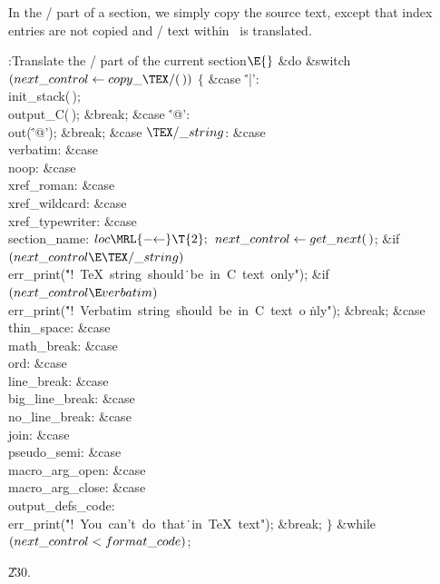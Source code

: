 In the \TEX/ part of a section, we simply copy the source text, except
that
index entries are not copied and \CEE/ text within \pb\ is translated.

\Y\B\4:Translate the \TEX/ part of the current section\X${}\E{}$\6
\&{do}\5
\&{switch} ${}(\\{next\_control}\K\copyxTeX(\,)){}$\5
${}\{{}$\1\6
\4\&{case} \.{'|'}:\5
\\{init\_stack}(\,);\6
\\{output\_C}(\,);\6
\&{break};\6
\4\&{case} \.{'@'}:\5
\\{out}(\.{'@'});\6
\&{break};\6
\4\&{case} ${}\TeXxstring{}$:\5
\&{case} \\{verbatim}:\5
\&{case} \\{noop}:\5
\&{case} \\{xref\_roman}:\5
\&{case} \\{xref\_wildcard}:\5
\&{case} \\{xref\_typewriter}:\5
\&{case} \\{section\_name}:\5
${}\\{loc}\MRL{-{\K}}\T{2};{}$\6
${}\\{next\_control}\leftarrow\\{get\_next}(\,){}$;\6
\&{if} ${}(\\{next\_control}\E\TeXxstring){}$\1\5
\\{err\_print}(\.{"!\ TeX\ string\ should}\)\.{\ be\ in\ C\ text\ only"});\2\6
\&{if} ${}(\\{next\_control}\E\\{verbatim}){}$\1\5
\\{err\_print}(\.{"!\ Verbatim\ string\ s}\)\.{hould\ be\ in\ C\ text\ o}\)%
\.{nly"});\2\6
\&{break};\6
\4\&{case} \\{thin\_space}:\5
\&{case} \\{math\_break}:\5
\&{case} \\{ord}:\5
\&{case} \\{line\_break}:\5
\&{case} \\{big\_line\_break}:\5
\&{case} \\{no\_line\_break}:\5
\&{case} \\{join}:\5
\&{case} \\{pseudo\_semi}:\5
\&{case} \\{macro\_arg\_open}:\5
\&{case} \\{macro\_arg\_close}:\5
\&{case} \\{output\_defs\_code}:\5
\\{err\_print}(\.{"!\ You\ can't\ do\ that}\)\.{\ in\ TeX\ text"});\6
\&{break};\6
\4${}\}{}$\2\5
\&{while} ${}(\\{next\_control}<\\{format\_code}){}$;\par
\U230.\fi

